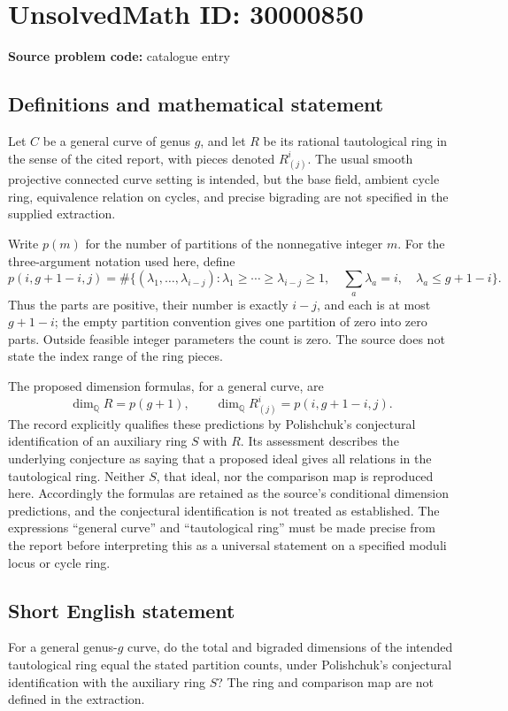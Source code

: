 \documentclass[11pt]{article}
\newcommand{\Q}{\mathbb{Q}}
\begin{document}
\section*{UnsolvedMath ID: 30000850}
\textbf{Source problem code:} catalogue entry
\subsection{Definitions and mathematical statement}
Let \(C\) be a general curve of genus \(g\), and let \(R\) be its rational tautological ring in the sense of the cited report, with pieces denoted \(R^i_{(j)}\). The usual smooth projective connected curve setting is intended, but the base field, ambient cycle ring, equivalence relation on cycles, and precise bigrading are not specified in the supplied extraction.

Write \(p(m)\) for the number of partitions of the nonnegative integer \(m\). For the three-argument notation used here, define
\[
p(i,g+1-i,j)=\#\{(\lambda_1,\ldots,\lambda_{i-j}):
\lambda_1\geq\cdots\geq\lambda_{i-j}\geq1,\quad
\textstyle\sum_a\lambda_a=i,\quad
\lambda_a\leq g+1-i\}.
\]
Thus the parts are positive, their number is exactly \(i-j\), and each is at most \(g+1-i\); the empty partition convention gives one partition of zero into zero parts. Outside feasible integer parameters the count is zero. The source does not state the index range of the ring pieces.

The proposed dimension formulas, for a general curve, are
\[
\dim_{\Q}R=p(g+1),\qquad
\dim_{\Q}R^i_{(j)}=p(i,g+1-i,j).
\]
The record explicitly qualifies these predictions by Polishchuk's conjectural identification of an auxiliary ring \(S\) with \(R\). Its assessment describes the underlying conjecture as saying that a proposed ideal gives all relations in the tautological ring. Neither \(S\), that ideal, nor the comparison map is reproduced here. Accordingly the formulas are retained as the source's conditional dimension predictions, and the conjectural identification is not treated as established. The expressions ``general curve'' and ``tautological ring'' must be made precise from the report before interpreting this as a universal statement on a specified moduli locus or cycle ring.
\subsection{Short English statement}
For a general genus-\(g\) curve, do the total and bigraded dimensions of the intended tautological ring equal the stated partition counts, under Polishchuk's conjectural identification with the auxiliary ring \(S\)? The ring and comparison map are not defined in the extraction.
\end{document}
